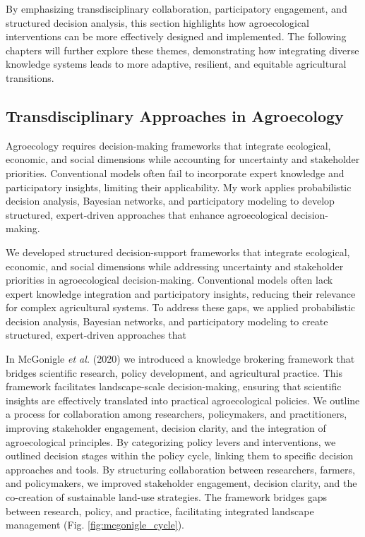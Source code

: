 \documentclass[
]{article}
\begin{document}
By emphasizing transdisciplinary collaboration, participatory
engagement, and structured decision analysis, this section highlights
how agroecological interventions can be more effectively designed and
implemented. The following chapters will further explore these themes,
demonstrating how integrating diverse knowledge systems leads to more
adaptive, resilient, and equitable agricultural transitions.

\hypertarget{transdisciplinary-approaches-in-agroecology}{%
\subsection{Transdisciplinary Approaches in
Agroecology}\label{transdisciplinary-approaches-in-agroecology}}

Agroecology requires decision-making frameworks that integrate
ecological, economic, and social dimensions while accounting for
uncertainty and stakeholder priorities. Conventional models often fail
to incorporate expert knowledge and participatory insights, limiting
their applicability. My work applies probabilistic decision analysis,
Bayesian networks, and participatory modeling to develop structured,
expert-driven approaches that enhance agroecological decision-making.

We developed structured decision-support frameworks that integrate
ecological, economic, and social dimensions while addressing uncertainty
and stakeholder priorities in agroecological decision-making.
Conventional models often lack expert knowledge integration and
participatory insights, reducing their relevance for complex
agricultural systems. To address these gaps, we applied probabilistic
decision analysis, Bayesian networks, and participatory modeling to
create structured, expert-driven approaches that

In McGonigle \emph{et al.} (2020) we introduced a knowledge brokering
framework that bridges scientific research, policy development, and
agricultural practice. This framework facilitates landscape-scale
decision-making, ensuring that scientific insights are effectively
translated into practical agroecological policies. We outline a process
for collaboration among researchers, policymakers, and practitioners,
improving stakeholder engagement, decision clarity, and the integration
of agroecological principles. By categorizing policy levers and
interventions, we outlined decision stages within the policy cycle,
linking them to specific decision approaches and tools. By structuring
collaboration between researchers, farmers, and policymakers, we
improved stakeholder engagement, decision clarity, and the co-creation
of sustainable land-use strategies. The framework bridges gaps between
research, policy, and practice, facilitating integrated landscape
management (Fig. \ref{fig:mcgonigle_cycle}).
\end{document}
